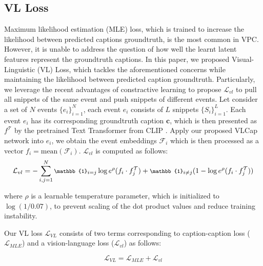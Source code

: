 \documentclass{article}
\begin{document}
\subsection{VL Loss}
\vspace{-2mm}
Maximum likelihood estimation (MLE) loss, which is trained to increase the likelihood between predicted captions groundtruth, is the most common in VPC. However, it is unable to address the question of how well the learnt latent features represent the groundtruth captions. In this paper, we proposed Visual-Linguistic (VL) Loss, which tackles the aforementioned concerns while maintaining the likelihood between predicted caption groundtruth. Particularly, we leverage the recent advantages of constractive learning to propose $\mathcal{L}_{vl}$ to pull all snippets of the same event and push snippets of different events. Let consider a set of $N$ events $\{e_i\}_{i=1}^N$, each event $e_i$ consists of $L$ snippets $\{S_i\}_{i=1}^L$. Each event $e_i$ has its corresponding groundtruth caption $\textbf{c}$, which is then presented as $f^\mathcal{T}$ by the pretrained Text Transformer from CLIP \cite{radford2021learning}. Apply our proposed VLCap network into $e_i$, we obtain the event embeddings $\mathcal{F}_i$ which is then processed as a vector $f_i = \text{mean}(\mathcal{F}_i)$. $\mathcal{L}_{vl}$ is computed as follows:
\vspace{-2mm}
\begin{equation}
\footnotesize
    \mathcal{L}_{vl} = -\sum_{i,j=1}^{N} \mathbb{1}_{i=j}\log e^\rho( f_{i} \cdot f_{j}^\mathcal{T})
    +  \mathbb{1}_{i\neq j}(1-\log e^\rho( f_{i} \cdot f_{j}^\mathcal{T}))
\vspace{-2mm}
\end{equation}

where $\rho$ is a learnable temperature parameter, which is initialized to $\log(1/0.07)$, to prevent scaling of the dot product values and reduce training instability.

Our VL loss $\mathcal{L}_{VL}$ consists of two terms corresponding to caption-caption loss ($\mathcal{L}_{MLE}$) and a vision-language loss ($\mathcal{L}_{vl}$) as follows:

\begin{equation}
\mathcal{L}_{VL} = \mathcal{L}_{MLE} + \mathcal{L}_{vl}
\end{equation}
\end{document}
